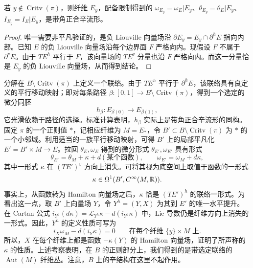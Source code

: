 \begin{lemma}\label{st:15.1}
若 $y\notin\operatorname{Critv}(\pi)$，则纤维 $E_y$，配备限制得到的 $\omega_{E_y}=\omega_E|E_y$、$\theta_{E_y}=\theta_E|E_y$、$I_{E_y}=I_E|E_y$，是带角正合辛流形。
\end{lemma}
\begin{proof}
唯一需要非平凡验证的，是负 Liouville 向量场沿 $\partial E_y=E_y\cap\partial^hE$ 指向内部。已知 $E$ 的负 Liouville 向量场沿每个边界面 $F$ 严格向内。现假设 $F$ 不属于 $\partial^vE$。由于 $TE^h$ 平行于 $F$，该向量场的 $TE^v$ 分量也沿 $F$ 严格向内。而这一分量恰是 $E_y$ 的负 Liouville 向量场，从而得到结论。
\end{proof}

分解在 $B\setminus\operatorname{Critv}(\pi)$ 上定义一个联络。由于 $TE^h$ 平行于 $\partial^hE$，该联络具有良定义的平行移动映射；即对每条路径 $\beta:[0,1]\to B\setminus\operatorname{Critv}(\pi)$，得到一个选定的微分同胚
\begin{equation}\label{eq:15.2}
h_\beta:E_{\beta(0)}\longrightarrow E_{\beta(1)},
\end{equation}
它光滑依赖于路径的选择。标准计算表明，$h_\beta$ 实际上是带角正合辛流形的同构。固定 $\pi$ 的一个正则值 $*$，记相应纤维为 $M=E_*$，令 $B'\subset B\setminus\operatorname{Critv}(\pi)$ 为 $*$ 的一个小邻域。利用适当的一族平行移动映射，可得 $B'$ 上的局部平凡化 $E'=B'\times M\to E$。拉回 $\theta_E,\omega_E$ 得到的微分形式 $\theta_{E'},\omega_{E'}$ 具有形式
\begin{equation}\label{eq:15.3}
\theta_{E'}=\theta_M+\kappa+d(\text{某个函数}),\qquad
\omega_{E'}=\omega_M+d\kappa,
\end{equation}
其中一形式 $\kappa$ 在 $(TE')^v$ 方向上消失。可将其视为底空间上取值于函数的一形式
\[
\kappa\in\Omega^1(B',C^\infty(M,\mathbb R)).
\]
事实上，从函数转为 Hamilton 向量场之后，$\kappa$ 恰是 $(TE')^h$ 的联络一形式。为看出这一点，取 $B'$ 上向量场 $Y$，令 $Y^h=(Y,X)$ 为其到 $E'$ 的唯一水平提升。在 Cartan 公式 $i_{Y^h}(d\kappa)=\mathcal L_{Y^h}\kappa-d(i_{Y^h}\kappa)$ 中，Lie 导数仍是纤维方向上消失的一形式。因此，$Y^h$ 的定义性质可写为
\[
i_X\omega_M-d(i_Y\kappa)=0\qquad\text{在每个纤维 }\{y\}\times M\text{ 上}.
\]
所以，$X$ 在每个纤维上都是函数 $-\kappa(Y)$ 的 Hamilton 向量场，证明了所声称的 $\kappa$ 的性质。上述考察表明，在 $B$ 的正则部分上，我们得到的是带选定联络的 $\operatorname{Aut}(M)$ 纤维丛。注意，$B$ 上的辛结构在这里不起作用。

